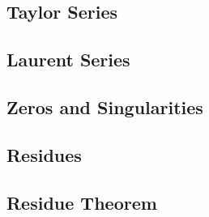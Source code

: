 \subsection{Taylor Series}

\subsection{Laurent Series}

\subsection{Zeros and Singularities}

\subsection{Residues}

\subsection{Residue Theorem}
